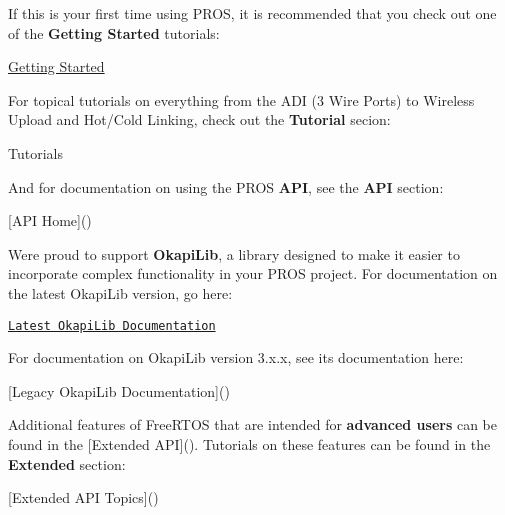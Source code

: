 If this is your first time using P\+R\+OS, it is recommended that you check out one of the {\bfseries Getting Started} tutorials\+:

\hyperlink{getting-started_2index_8md}{Getting Started}

For topical tutorials on everything from the A\+DI (3 Wire Ports) to Wireless Upload and Hot/\+Cold Linking, check out the {\bfseries Tutorial} secion\+:

Tutorials

And for documentation on using the P\+R\+OS {\bfseries A\+PI}, see the {\bfseries A\+PI} section\+:

\mbox{[}A\+PI Home\mbox{]}()

We\textquotesingle{}re proud to support {\bfseries Okapi\+Lib}, a library designed to make it easier to incorporate complex functionality in your P\+R\+OS project. For documentation on the latest Okapi\+Lib version, go here\+:

\href{https://okapilib.github.io/OkapiLib/index.html}{\tt Latest Okapi\+Lib Documentation}

For documentation on Okapi\+Lib version 3.\+x.\+x, see its documentation here\+:

\mbox{[}Legacy Okapi\+Lib Documentation\mbox{]}()

Additional features of Free\+R\+T\+OS that are intended for {\bfseries advanced users} can be found in the \mbox{[}Extended A\+PI\mbox{]}(). Tutorials on these features can be found in the {\bfseries Extended} section\+:

\mbox{[}Extended A\+PI Topics\mbox{]}() 